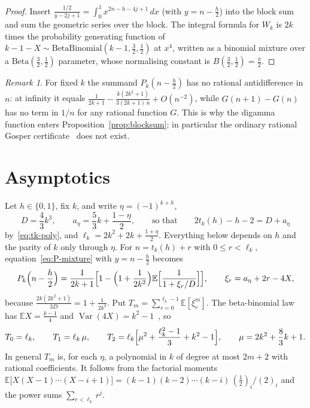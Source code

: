 \documentclass[11pt]{article}
\theoremstyle{definition}
\theoremstyle{remark}
\newtheorem{remark}[theorem]{Remark}
\newcommand{\E}{\mathbb{E}}
\begin{document}
\begin{proof}
Insert $\frac{1/2}{y-2j+1}=\int_0^1x^{2n-h-4j+1}\,dx$ (with $y=n-\frac h2$)
into the block sum and sum the geometric series over the block. The
integral formula for $W_k$ is $2k$ times the probability generating
function of $k-1-X\sim\mathrm{BetaBinomial}(k-1,\frac32,\frac12)$ at
$x^4$, written as a binomial mixture over a $\mathrm{Beta}(\frac32,\frac12)$
parameter, whose normalising constant is $B(\frac32,\frac12)=\frac\pi2$.
\end{proof}

\begin{remark}
For fixed $k$ the summand $P_k(n-\frac h2)$ has no rational
antidifference in $n$: at infinity it equals
$\frac1{2k+1}-\frac{k(2k^2+1)}{3(2k+1)\,n}+O(n^{-2})$, while $G(n+1)-G(n)$
has no term in $1/n$ for any rational function $G$. This is why the
digamma function enters Proposition~\ref{prop:blocksum}; in particular
the ordinary rational Gosper certificate~\cite{Gosper} does not exist.
\end{remark}

\section{Asymptotics}\label{sec:asymptotics}

Let $h\in\{0,1\}$, fix $k$, and write $\eta=(-1)^{k+h}$,
\[
D=\frac43k^3,\qquad a_\eta=\frac53k+\frac{1-\eta}2,
\qquad\text{so that}\qquad 2t_k(h)-h-2=D+a_\eta
\]
by~\eqref{eq:tk-poly}, and $\ell_k=2k^2+2k+\frac{1+\eta}2$. Everything
below depends on $h$ and the parity of $k$ only through $\eta$. For
$n=t_k(h)+r$ with $0\le r<\ell_k$, equation~\eqref{eq:P-mixture} with
$y=n-\frac h2$ becomes
\begin{equation}\label{eq:P-geometric}
P_k\Bigl(n-\frac h2\Bigr)=\frac1{2k+1}\Bigl[1-\Bigl(1+\frac1{2k^2}\Bigr)
\E\Bigl[\frac1{1+\xi_r/D}\Bigr]\Bigr],\qquad \xi_r=a_\eta+2r-4X,
\end{equation}
because $\frac{2k(2k^2+1)}{3D}=1+\frac1{2k^2}$. Put
$T_m=\sum_{r=0}^{\ell_k-1}\E[\xi_r^m]$. The beta-binomial law has
$\E X=\frac{k-1}4$ and $\operatorname{Var}(4X)=k^2-1$~\cite{JKK}, so
\[
T_0=\ell_k,\qquad T_1=\ell_k\,\mu,\qquad
T_2=\ell_k\Bigl[\mu^2+\frac{\ell_k^2-1}3+k^2-1\Bigr],\qquad
\mu=2k^2+\frac83k+1 .
\]
In general $T_m$ is, for each $\eta$, a polynomial in $k$ of degree at
most $2m+2$ with rational coefficients. It follows from the factorial
moments $\E\bigl[X(X-1)\cdots(X-i+1)\bigr]=(k-1)(k-2)\cdots(k-i)\,
(\frac12)_i/(2)_i$ and the power sums $\sum_{r<\ell_k}r^j$.
\end{document}
